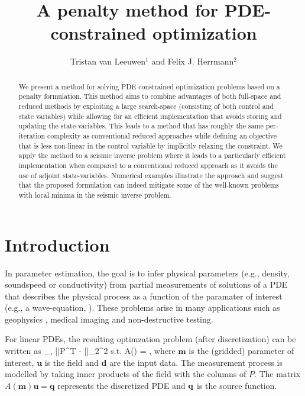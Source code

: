 \documentclass{iopart}
\begin{document}
\title[A penalty method for PDE-constrained optimization]{A penalty method for PDE-constrained optimization}
\author{Tristan van Leeuwen$^1$ and Felix J. Herrmann$^2$}
\address{$^1$Centrum Wiskunde \& Informatica. Science Park, Amsterdam, the Netherlands\\
$^2$ Dept. of Earth, Ocean and Atmospheric Sciences.\\2207 Main Mall, Vancouver, BC Canada V6T 1Z4.}

\begin{abstract}
We present a method for solving PDE constrained optimization problems
based on a penalty formulation. This method aims to combine advantages
of both full-space and reduced methods by exploiting a large
search-space (consisting of both control and state variables) while
allowing for an efficient implementation that avoids storing and
updating the state-variables. This leads to a method that has roughly
the same per-iteration complexity as conventional reduced approaches
while defining an objective that is less non-linear in the control
variable by implicitly relaxing the constraint. We apply the method to a
seismic inverse problem where it leads to a particularly efficient
implementation when compared to a conventional reduced approach as it
avoids the use of adjoint state-variables. Numerical examples illustrate
the approach and suggest that the proposed formulation can indeed
mitigate some of the well-known problems with local minima in the
seismic inverse problem.
\end{abstract}

\maketitle

\section{Introduction}
In parameter estimation, the goal is to infer physical parameters (e.g., density, soundspeed or conductivity) 
from partial measurements of solutions of a PDE that describes the physical process as a 
function of the paramater of interest (e.g., a wave-equation, ). These problems arise in many applications such as
geophysics \cite{Haber2004,Epanomeritakis08}, medical imaging \cite{Abdoulaev2005} and non-destructive testing.

For linear PDEs, the resulting optimzation problem (after discretization) can be written as
\bq
\label{eq:constr}
\min_{,} ||P^T - ||_2^2 \quad 
\mbox{s.t.} \quad A() = ,
\eq
where $\mathbf{m}$ is the (gridded) parameter of interest, $\mathbf{u}$ is the field and $\mathbf{d}$ are
the input data. The measurement process is modelled by taking inner products of the field with the columns of $P$. 
The matrix $A(\mathbf{m})\mathbf{u} = \mathbf{q}$ represents the discretized PDE and $\mathbf{q}$ is the 
source function. 
\end{document}
